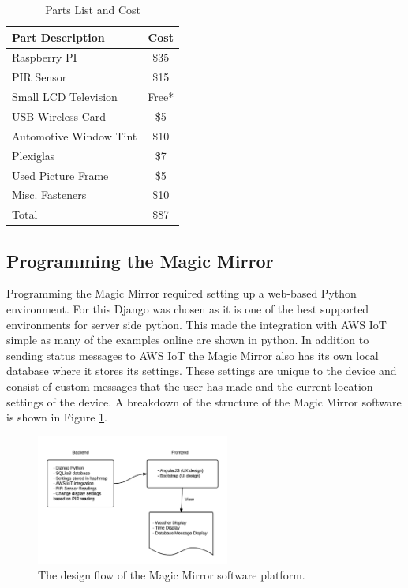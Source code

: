 \documentclass[conference]{IEEEtran}
\begin{document}
\begin{table}[!t]
\renewcommand{\arraystretch}{1.3}
\caption{Parts List and Cost}
\label{tab:cost}
\centering
\begin{tabular}{|l|c|}
\hline
Part Description & Cost\\
\hline
\hline
Raspberry PI & \$35\\
\hline
PIR Sensor & \$15\\
\hline
Small LCD Television & Free*\\
\hline
USB Wireless Card & \$5\\
\hline
Automotive Window Tint & \$10\\
\hline
Plexiglas & \$7\\
\hline
Used Picture Frame & \$5\\
\hline
Misc. Fasteners & \$10\\
\hline
\hline
Total & \$87\\
\hline
\end{tabular}
\end{table}

\subsection{Programming the Magic Mirror}
Programming the Magic Mirror required setting up a web-based Python environment.
For this Django was chosen as it is one of the best supported environments for server side python.
This made the integration with AWS IoT simple as many of the examples online are shown in python.
In addition to sending status messages to AWS IoT the Magic Mirror also has its own local database where it stores its settings.
These settings are unique to the device and consist of custom messages that the user has made and the current location settings of the device.
A breakdown of the structure of the Magic Mirror software is shown in Figure \ref{fig:design}.

\begin{figure}[!ht]
\centering
\includegraphics[width=2.5in]{images/DesignFlow.png}
\caption{The design flow of the Magic Mirror software platform.}
\label{fig:design}
\end{figure}
\end{document}
